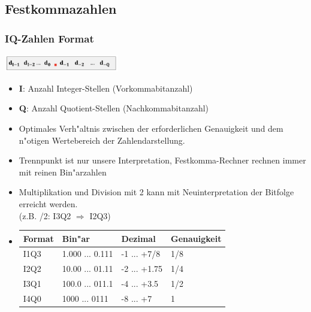 \subsection{Festkommazahlen}
\begin{minipage}[t]{9cm}
	\subsubsection{IQ-Zahlen Format}
	\includegraphics[width=5cm]{pics/IQ-Zahlen}
	\begin{itemize}
		\item \textbf{I}: Anzahl Integer-Stellen (Vorkommabitanzahl)
		\item \textbf{Q}: Anzahl Quotient-Stellen (Nachkommabitanzahl)
		\item Optimales Verh"altnis zwischen der erforderlichen Genauigkeit und dem n"otigen Wertebereich der Zahlendarstellung.
		\item Trennpunkt ist nur unsere Interpretation, Festkomma-Rechner rechnen immer mit reinen Bin"arzahlen
		\item Multiplikation und Division mit 2 kann mit Neuinterpretation der Bitfolge erreicht werden. \\(z.B. /2: I3Q2 $\Rightarrow$ I2Q3)
		\item \begin{tabular}{|l|l|l|l|}
				\hline
				\rowcolor[HTML]{C0C0C0} 
				Format             & Bin"ar          & Dezimal                       & Genauigkeit                \\ \hline
				\rowcolor[HTML]{EFEFEF} 
				{\color[HTML]{000000} I1Q3} & {\color[HTML]{000000} 1.000 ... 0.111} & {\color[HTML]{000000} -1 ... +7/8}  & {\color[HTML]{000000} 1/8} \\ \hline
				\rowcolor[HTML]{EFEFEF} 
				{\color[HTML]{000000} I2Q2} & {\color[HTML]{000000} 10.00 ... 01.11} & 	{\color[HTML]{000000} -2 ... +1.75} & {\color[HTML]{000000} 1/4} \\ \hline
				\rowcolor[HTML]{EFEFEF} 
				{\color[HTML]{000000} I3Q1} & {\color[HTML]{000000} 100.0 ... 011.1} & {\color[HTML]{000000} -4 ... +3.5}  & {\color[HTML]{000000} 1/2} \\ \hline
				\rowcolor[HTML]{EFEFEF} 
				{\color[HTML]{000000} I4Q0} & {\color[HTML]{000000} 1000 ... 0111}   & {\color[HTML]{000000} -8 ... +7}    & {\color[HTML]{000000} 1}   \\ \hline
			\end{tabular}	
	\end{itemize}
\end{minipage}
